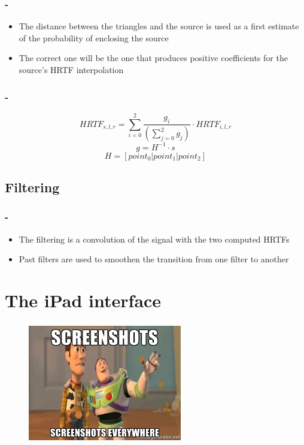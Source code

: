 \documentclass{beamer}
\begin{document}
	\begin{frame}
		\frametitle{\insertsection - \insertsubsection}
		\begin{itemize}
			\item The distance between the triangles and the source is used as a first estimate of the probability of enclosing
				the source
			\item The correct one will be the one that produces positive coefficients for the source's HRTF interpolation
		\end{itemize}
	\end{frame}

	\begin{frame}
		\frametitle{\insertsection - \insertsubsection}
		$$ HRTF_{s,l,r} = \sum\limits_{i=0}^2 \dfrac{ g_i } { \left( \sum\limits_{j=0}^2 g_j \right) } \cdot HRTF_{i,l,r} $$
		$$ g = H^{-1} \cdot s $$
		$$ H = [ point_0 | point_1 | point_2 ] $$
	\end{frame}
	
	\subsection{Filtering}

	\begin{frame}
		\frametitle{\insertsection - \insertsubsection}
		\begin{itemize}
			\item The filtering is a convolution of the signal with the two computed HRTFs
			\item Past filters are used to smoothen the transition from one filter to another
		\end{itemize}
	\end{frame}

	\section{The iPad interface}

	\begin{frame}
		\frametitle{\insertsection}
		\begin{figure}
			\centering
			  \includegraphics[width=0.6\textwidth]{images/marine.jpg}
		\end{figure}
	\end{frame}

	\begin{frame}
		\frametitle{\insertsection}
	\end{frame}

	\begin{frame}
		\frametitle{\insertsection}
	\end{frame}
\end{document}

